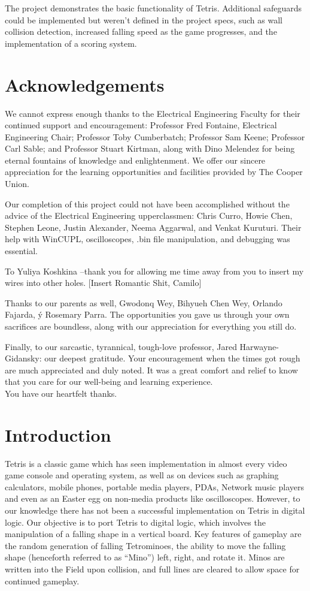 \documentclass[letterpaper,titlepage,oneside]{article}
\begin{document}
The project demonstrates the basic functionality of Tetris. Additional safeguards could be implemented but weren't defined in the project specs, such as wall collision detection, increased falling speed as the game progresses, and the implementation of a scoring system.
\clearpage

\section*{Acknowledgements}
We cannot express enough thanks to the Electrical Engineering Faculty for their continued support and 
encouragement:  Professor Fred Fontaine, Electrical Engineering Chair; Professor Toby Cumberbatch; Professor Sam Keene; Professor Carl Sable; and Professor Stuart Kirtman, along with Dino Melendez for being eternal fountains of knowledge and enlightenment. We offer our sincere appreciation for the learning opportunities and facilities provided by The Cooper Union. 

Our completion of this project could not have been accomplished without the advice of the Electrical Engineering upperclassmen: Chris Curro, Howie Chen, Stephen Leone, Justin Alexander, Neema Aggarwal, and Venkat Kuruturi. Their help with WinCUPL, oscilloscopes, .bin file manipulation, and debugging was essential. 

To Yuliya Koshkina –thank you for allowing me time away from you to insert my wires into other holes. [Insert Romantic Shit, Camilo]  

Thanks to our parents as well, Gwodonq Wey, Bihyueh Chen Wey, Orlando Fajarda, \'y Rosemary Parra. The opportunities you gave us through your own sacrifices are boundless, along with our appreciation for everything you still do.

Finally, to our sarcastic, tyrannical, tough-love professor, Jared Harwayne-Gidansky: our deepest gratitude. Your encouragement when the times got rough are much appreciated and duly noted. It was a great comfort and relief to know that you care for our well-being and learning experience. \\[5pt]
You have our heartfelt thanks.
\clearpage
{}
\tableofcontents
\pagebreak
{}
\section{Introduction}
Tetris is a classic game which has seen implementation in almost every video game console and operating system, as well as on devices such as graphing calculators, mobile phones, portable media players, PDAs, Network music players and even as an Easter egg on non-media products like oscilloscopes. However, to our knowledge there has not been a successful implementation on Tetris in digital logic. Our objective is to port Tetris to digital logic, which involves the manipulation of a falling shape in a vertical board. Key features of gameplay are the random generation of falling Tetrominoes, the ability to move the falling shape (henceforth referred to as ``Mino'') left, right, and rotate it. Minos are written into the Field upon collision, and full lines are cleared to allow space for continued gameplay. 
\end{document}
